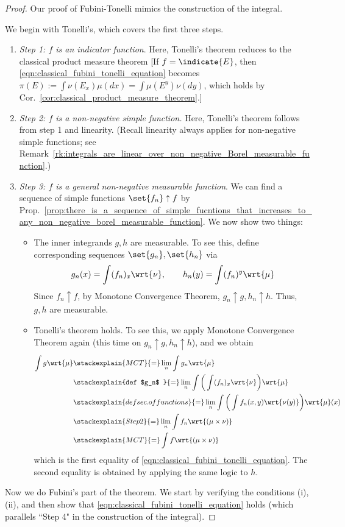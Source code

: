 \documentclass{article} %
\newcommand{\dmu}{\wrt{\mu}}
\begin{document}
\begin{proof}
Our proof of Fubini-Tonelli mimics the construction of the integral.   

We begin with Tonelli's, which covers the first three steps.
\begin{enumerate}
\item \textit{Step 1: $f$ is an indicator function}.   Here, Tonelli's theorem reduces to the classical product measure theorem {\tiny  [If $f=\indicate{E}$, then \eqref{eqn:classical_fubini_tonelli_equation} becomes $\pi(E) := \int \nu(E_x) \mu(dx) = \int \mu(E^y) \nu(dy) $, which holds by   Cor.~\ref{cor:classical_product_measure_theorem}.]}   %
\item \textit{Step 2: $f$ is a non-negative simple function.}  Here, Tonelli's theorem follows from step 1 and linearity. {\tiny (Recall linearity always applies for non-negative simple functions; see Remark~\ref{rk:integrals_are_linear_over_non_negative_Borel_measurable_function}.)}  
\item \textit{Step 3: $f$ is a general non-negative measurable function}.  We can find a sequence of simple functions $\set{f_n} \uparrow f$ by Prop.~\ref{prop:there_is_a_sequence_of_simple_fucntions_that_increases_to_any_non_negative_borel_measurable_function}.   We now show two things:
	\begin{itemize}
	\item The inner integrands $g, h$ are measurable. To see this, define corresponding sequences $\set{g_n}, \set{h_n}$ via 
	\[ g_n(x) = \int (f_n)_x \wrt{\nu}, \quad \quad h_n(y) = \int (f_n)^y \wrt{\mu} \]
	Since $f_n \uparrow f$, by Monotone Convergence Theorem, $g_n \uparrow g, h_n \uparrow h$. Thus, $g, h$ are measurable. 
	\item Tonelli's theorem holds.  To see this, we apply Monotone Convergence Theorem again {\tiny (this time on $g_n \uparrow g, h_n \uparrow h$)}, and we obtain 
	\begin{align*}
	\int g \dmu & \stackexplain{MCT
	}{=} \lim_n \int g_n \dmu  \\
	&\stackexplain{def $g_n$
	}{=}\lim_n \int \bigg( \int (f_n)_x \wrt{\nu} \bigg) \dmu \\
	& \stackexplain{def sec. of functions}{=} \lim_n \int \bigg( \int f_n(x,y) \wrt{\nu(y)} \bigg) \dmu(x) \\
	& \stackexplain{Step 2}{=} \lim_n \int f_n \wrt{(\mu \times \nu)} \\
	& \stackexplain{MCT}{=} \int f \wrt{(\mu \times \nu)}
	\end{align*}
	which is the first equality of \eqref{eqn:classical_fubini_tonelli_equation}.  The second equality is obtained by applying the same logic to $h$. 
	\end{itemize}
\end{enumerate}
Now we do Fubini's part of the theorem.  We start by verifying the conditions (i),(ii), and then show that \eqref{eqn:classical_fubini_tonelli_equation} holds (which parallels ``Step 4" in the construction of the integral).


\end{proof}
\end{document}
